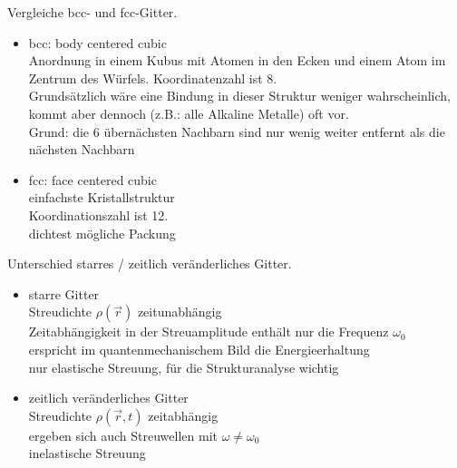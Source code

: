 \documentclass[a5paper,12pt,ngerman,grid=front %
,print
]{kartei}
\begin{document}
	\begin{karte}{
		Vergleiche bcc- und fcc-Gitter.
		}
		
		\begin{itemize}
			\item bcc: body centered cubic \\
				Anordnung in einem Kubus mit Atomen in den Ecken und einem Atom im Zentrum des Würfels.
				Koordinatenzahl ist 8. \\
				Grundsätzlich wäre eine Bindung in dieser Struktur weniger wahrscheinlich, kommt aber dennoch (z.B.: alle Alkaline Metalle) oft vor.\\
				Grund: die 6 übernächsten Nachbarn sind nur wenig weiter entfernt als die nächsten Nachbarn
				
			\item fcc: face centered cubic \\
				einfachste Kristallstruktur \\
				Koordinationszahl ist 12. \\
				dichtest mögliche Packung
		\end{itemize}
		
	\end{karte}


	\begin{karte}{
		Unterschied starres / zeitlich veränderliches Gitter.
		}
		
		\begin{itemize}
			\item starre Gitter \\
				Streudichte $\rho(\vec{r})$ zeitunabhängig\\
				Zeitabhängigkeit in der Streuamplitude enthält nur die Frequenz $\omega_0$ \\
				erspricht im quantenmechanischem Bild die Energieerhaltung \\
				nur elastische Streuung, für die Strukturanalyse wichtig
				
			\item zeitlich veränderliches Gitter \\
				Streudichte $ \rho( \vec{r},t ) $ zeitabhängig \\
				ergeben sich auch Streuwellen mit $ \omega \neq \omega_0 $ \\
				inelastische Streuung
				
		\end{itemize}
		
	\end{karte}
\end{document}
